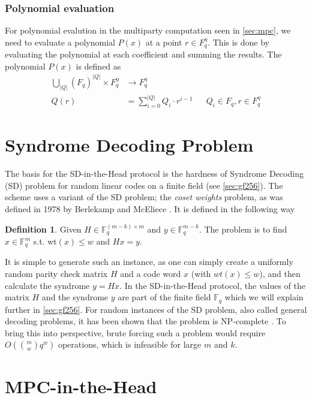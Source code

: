 \documentclass[twoside,11pt,openright]{report}
\theoremstyle{definition}
\newtheorem{definition}{Definition}[section]
\theoremstyle{plain}
\begin{document}
\subsubsection{Polynomial evaluation}
For polynomial evalution in the multiparty computation seen in \autoref{sec:mpc}, we need to evaluate a polynomial $P(x)$ at a point $r \in F_q^\eta$. This is done by evaluating the polynomial at each coefficient and summing the results. The polynomial $P(x)$ is defined as
\begin{align}
  \textstyle\bigcup_{|Q|}(F_q)^{|Q|} \times F_q^\eta & \rightarrow F_q^\eta                 \nonumber                                  \\
  Q(r)                                               & = \textstyle\sum_{i=0}^{|Q|} Q_i \cdot r^{i-1} &  & Q_i \in F_q, r \in F_q^\eta
  \label{eq:mpcpoly}
\end{align}

\section{Syndrome Decoding Problem}
\label{sec:syndrome}

The basis for the SD-in-the-Head protocol is the hardness of Syndrome Decoding (SD) problem for random linear codes on a finite field (see \autoref{sec:gf256}). The scheme uses a variant of the SD problem; the \textit{coset weights} problem, as was defined in 1978 by Berlekamp and McEliece \cite{berlekamp1978inherent}. It is defined in the following way
\begin{definition}
  \label{def:syndrome}
  Given $H \in \mathbb{F}^{(m-k)\times m}_q$ and $y \in \mathbb{F}^{m-k}_q$. The problem is to find $x \in \mathbb{F}^m_q$ s.t. wt$(x) \leq w$ and $Hx = y$.
\end{definition}
It is simple to generate such an instance, as one can simply create a uniformly random parity check matrix $H$ and a code word $x$ (with $wt(x) \leq w$), and then calculate the syndrome $y = Hx$. In the SD-in-the-Head protocol, the values of the matrix $H$ and the syndrome $y$ are part of the finite field $\mathbb{F}_q$ which we will explain further in \autoref{sec:gf256}. For random instances of the SD problem, also called general decoding problems, it has been shown that the problem is NP-complete \cite{berlekamp1978inherent}. To bring this into perspective, brute forcing such a problem would require $O(\binom{m}{w} q^w)$ operations, which is infeasible for large $m$ and $k$.

\section{MPC-in-the-Head}
\label{sec:mpcinth}
\end{document}
